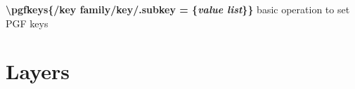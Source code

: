 \documentclass[10pt]{article}
\newcommand{\tikzcmd}[1]{\textbf{#1}}
\newcommand{\tikzparam}[1]{\textbf{\emph{#1}}}
\begin{document}
\begin{multicols}{2}

        \tikzcmd{\textbackslash pgfkeys\{/key family/key/.subkey = \{\tikzparam{value list}\}\}} basic operation to set PGF keys

        \section{Layers}

    \end{multicols}
\end{document}
